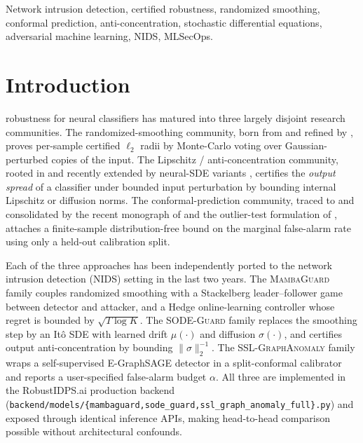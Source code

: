 \documentclass[journal,twoside]{IEEEtran}
\begin{document}
\begin{IEEEkeywords}
Network intrusion detection, certified robustness, randomized smoothing,
conformal prediction, anti-concentration, stochastic differential
equations, adversarial machine learning, NIDS, MLSecOps.
\end{IEEEkeywords}

\section{Introduction}
 robustness for neural classifiers has matured
into three largely disjoint research communities. The randomized-smoothing
community, born from \cite{cohen2019smoothing} and refined by
\cite{salman2019adv,yang2020rsmooth}, proves per-sample
certified $\ell_2$ radii by Monte-Carlo voting over Gaussian-perturbed
copies of the input. The Lipschitz / anti-concentration community,
rooted in \cite{hein2017formal,gowal2019ibp,wong2018convex} and recently
extended by neural-SDE variants
\cite{kong2020sde,liu2022nsde,chen2024sdeguard}, certifies the
\emph{output spread} of a classifier under bounded input perturbation by
bounding internal Lipschitz or diffusion norms. The conformal-prediction
community, traced to \cite{vovk2005algorithmic} and consolidated by the
recent monograph of \cite{angelopoulos2023gentle} and the outlier-test
formulation of \cite{bates2023testing}, attaches a finite-sample
distribution-free bound on the marginal false-alarm rate using only a
held-out calibration split.

Each of the three approaches has been independently ported to the
network intrusion detection (NIDS) setting in the last two years. The
\textsc{MambaGuard} family
\cite{anaedevha2024surrogate} couples randomized smoothing with a
Stackelberg leader--follower game between detector and attacker, and a
Hedge online-learning controller whose regret is bounded by
$\sqrt{T \log K}$. The \textsc{SODE-Guard} family
\cite{chen2024sdeguard} replaces the smoothing step by an It\^o SDE with
learned drift $\mu(\cdot)$ and diffusion $\sigma(\cdot)$, and certifies
output anti-concentration by bounding $\|\sigma\|_2^{-1}$. The
\textsc{SSL-GraphAnomaly} family \cite{anaedevha2026sslgraph} wraps a
self-supervised E-GraphSAGE \cite{lo2022} detector in a split-conformal
calibrator and reports a user-specified false-alarm budget $\alpha$.
All three are implemented in the RobustIDPS.ai production backend
(\texttt{backend/models/\{mambaguard,sode\_guard,ssl\_graph\_anomaly\_full\}.py})
and exposed through identical inference APIs, making head-to-head
comparison possible without architectural confounds.
\end{document}
